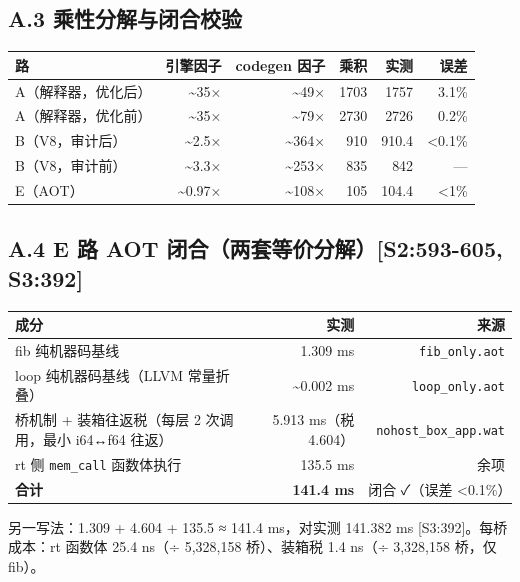 \documentclass[11pt, a4paper]{article}
\begin{document}
\subsection{A.3 乘性分解与闭合校验}

\begin{center}\small\begin{tabular}{lrrrrr}
\toprule
路 & 引擎因子 & codegen 因子 & 乘积 & 实测 & 误差 \\
\midrule
A（解释器，优化后） & \textasciitilde{}35× & \textasciitilde{}49× & 1703 & 1757 & 3.1\% \\
A（解释器，优化前） & \textasciitilde{}35× & \textasciitilde{}79× & 2730 & 2726 & 0.2\% \\
B（V8，审计后） & \textasciitilde{}2.5× & \textasciitilde{}364× & 910 & 910.4 & <0.1\% \\
B（V8，审计前） & \textasciitilde{}3.3× & \textasciitilde{}253× & 835 & 842 & — \\
E（AOT） & \textasciitilde{}0.97× & \textasciitilde{}108× & 105 & 104.4 & <1\% \\
\bottomrule
\end{tabular}\end{center}


\subsection{A.4 E 路 AOT 闭合（两套等价分解）[S2:593-605, S3:392]}

\begin{center}\small\begin{tabular}{lrr}
\toprule
成分 & 实测 & 来源 \\
\midrule
fib 纯机器码基线 & 1.309 ms & \texttt{fib\_only.aot} \\
loop 纯机器码基线（LLVM 常量折叠） & \textasciitilde{}0.002 ms & \texttt{loop\_only.aot} \\
桥机制 + 装箱往返税（每层 2 次调用，最小 i64↔f64 往返） & 5.913 ms（税 4.604） & \texttt{nohost\_box\_app.wat} \\
rt 侧 \texttt{mem\_call} 函数体执行 & 135.5 ms & 余项 \\
\textbf{合计} & \textbf{141.4 ms} & 闭合 ✓（误差 <0.1\%） \\
\bottomrule
\end{tabular}\end{center}


另一写法：1.309 + 4.604 + 135.5 ≈ 141.4 ms，对实测 141.382 ms [S3:392]。每桥成本：rt 函数体 25.4 ns（÷ 5,328,158 桥）、装箱税 1.4 ns（÷ 3,328,158 桥，仅 fib）。
\end{document}

